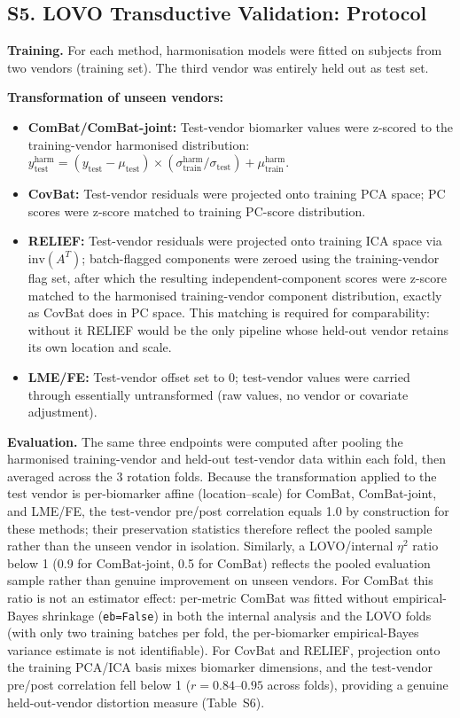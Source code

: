 \documentclass[12pt,a4paper]{article}
\begin{document}
\subsection*{S5. LOVO Transductive Validation: Protocol}

\textbf{Training.} For each method, harmonisation models were fitted on subjects from two vendors (training set). The third vendor was entirely held out as test set.

\textbf{Transformation of unseen vendors:}
\begin{itemize}[nosep]
  \item \textbf{ComBat/ComBat-joint:} Test-vendor biomarker values were z-scored to the training-vendor harmonised distribution: $y_{\text{test}}^{\text{harm}} = (y_{\text{test}} - \mu_{\text{test}}) \times (\sigma_{\text{train}}^{\text{harm}} / \sigma_{\text{test}}) + \mu_{\text{train}}^{\text{harm}}$.
  \item \textbf{CovBat:} Test-vendor residuals were projected onto training PCA space; PC scores were z-score matched to training PC-score distribution.
  \item \textbf{RELIEF:} Test-vendor residuals were projected onto training ICA space via $\text{inv}(A^T)$; batch-flagged components were zeroed using the training-vendor flag set, after which the resulting independent-component scores were z-score matched to the harmonised training-vendor component distribution, exactly as CovBat does in PC space. This matching is required for comparability: without it RELIEF would be the only pipeline whose held-out vendor retains its own location and scale.
  \item \textbf{LME/FE:} Test-vendor offset set to 0; test-vendor values were carried through essentially untransformed (raw values, no vendor or covariate adjustment).
\end{itemize}

\textbf{Evaluation.} The same three endpoints were computed after pooling the harmonised training-vendor and held-out test-vendor data within each fold, then averaged across the 3 rotation folds. Because the transformation applied to the test vendor is per-biomarker affine (location--scale) for ComBat, ComBat-joint, and LME/FE, the test-vendor pre/post correlation equals 1.0 by construction for these methods; their preservation statistics therefore reflect the pooled sample rather than the unseen vendor in isolation. Similarly, a LOVO/internal $\eta^2$ ratio below 1 (0.9 for ComBat-joint, 0.5 for ComBat) reflects the pooled evaluation sample rather than genuine improvement on unseen vendors. For ComBat this ratio is not an estimator effect: per-metric ComBat was fitted without empirical-Bayes shrinkage (\texttt{eb=False}) in both the internal analysis and the LOVO folds (with only two training batches per fold, the per-biomarker empirical-Bayes variance estimate is not identifiable). For CovBat and RELIEF, projection onto the training PCA/ICA basis mixes biomarker dimensions, and the test-vendor pre/post correlation fell below 1 ($r=0.84$--$0.95$ across folds), providing a genuine held-out-vendor distortion measure (Table~S6).
\end{document}
